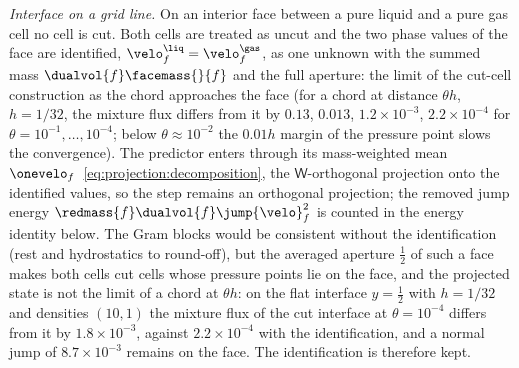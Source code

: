 \emph{Interface on a grid line.} On an interior face between a pure liquid
and a pure gas cell no cell is cut. Both cells are treated as uncut and the
two phase values of the face are identified, $\velo^{\liq}_f=\velo^{\gas}_f$,
as one unknown with the summed mass $\dualvol{f}\facemass{}{f}$ and the full
aperture: the limit of the cut-cell construction as the chord approaches the
face (for a chord at distance $\theta h$, $h=1/32$, the mixture flux differs
from it by $0.13$, $0.013$, $1.2\times10^{-3}$, $2.2\times10^{-4}$ for
$\theta=10^{-1},\dots,10^{-4}$; below $\theta\approx10^{-2}$ the $0.01h$ margin of
the pressure point slows the convergence). The predictor enters through its mass-weighted mean
$\onevelo_f$~\cref{eq:projection:decomposition}, the $\mathsf W$-orthogonal
projection onto the identified values, so the step remains an orthogonal
projection; the removed jump energy $\redmass{f}\dualvol{f}\jump{\velo}_f^2$ is
counted in the energy identity below. The Gram blocks would be consistent
without the identification (rest and hydrostatics to round-off), but the
averaged aperture $\tfrac12$ of such a face makes both cells cut cells whose
pressure points lie on the face, and the projected state is not the limit of
a chord at $\theta h$: on the flat interface $y=\tfrac12$ with $h=1/32$ and
densities $(10,1)$ the mixture flux of the cut interface at $\theta=10^{-4}$
differs from it by $1.8\times10^{-3}$, against $2.2\times10^{-4}$ with the
identification, and a normal jump of $8.7\times10^{-3}$ remains on the face.
The identification is therefore kept.


